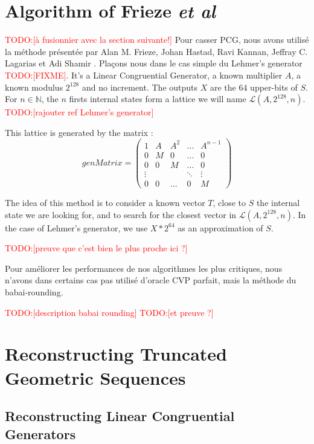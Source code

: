 \documentclass[preprint,svgnames]{iacrtrans}
\newcommand{\todo}[1]{\textcolor{red}{TODO:[#1]}}
\begin{document}
\section{Algorithm of Frieze \textit{et al}}

\todo{à fusionnier avec la section suivante!}
Pour casser PCG, nous avons utilisé la méthode présentée par Alan M. Frieze, Johan Hastad, Ravi Kannan, Jeffray C. Lagarias et Adi Shamir \cite{Frieze}. Plaçons nous dans le cas simple du Lehmer's generator \todo{FIXME}. It's a Linear Congruential Generator, a known multiplier $A$, a known modulus $2^128$ and no increment. The outputs $X$ are the 64 upper-bits of $S$. For $n \in \mathbb{N}$, the $n$ firsts internal states form a lattice we will name $\mathcal{L}(A,2^{128},n)$. 
\todo{rajouter ref Lehmer's generator}

This lattice is generated by the matrix :
\begin{equation}
genMatrix =
\begin{pmatrix} 
1 & A & A^2 & \dots & A^{n- 1}\\
0 & M & 0 & \dots & 0\\
0 & 0 & M & \dots & 0\\
\vdots & & & \ddots & \vdots\\
0 & 0 & \dots & 0 & M
\end{pmatrix}
\end{equation}

The idea of this method is to consider a known vector $T$, close to $S$ the internal state we are looking for, and to search for the closest vector in $\mathcal{L}(A,2^{128},n)$. In the case of Lehmer's generator, we use $X * 2^{64}$ as an approximation of $S$.

\todo{preuve que c'est bien le plus proche ici ?}

Pour améliorer les performances de nos algorithmes les plus critiques, nous n'avons dans certains cas pas utilisé d'oracle CVP parfait, mais la méthode du babai-rounding. 

\todo{description babai rounding}
\todo{et preuve ?}

\section{Reconstructing Truncated Geometric Sequences}
\label{sec:geometric}

\subsection{Reconstructing Linear Congruential Generators}
\end{document}
